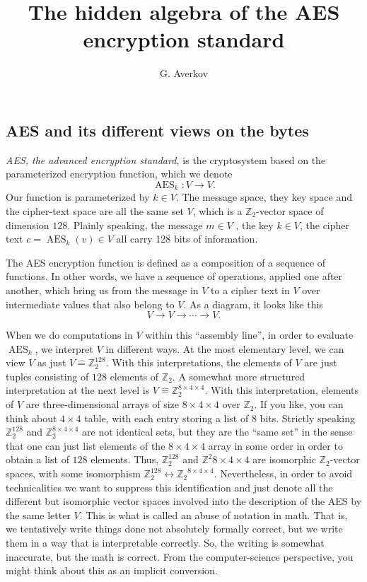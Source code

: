 \documentclass[11pt,a4paper]{amsart}
\title{The hidden algebra of the AES encryption standard}
\author{G. Averkov}
\newcommand{\AES}{\operatorname{AES}}
\newcommand{\Z}{\mathbb{Z}}
\begin{document}
\maketitle

\subsection*{AES and its different views on the bytes}

\emph{AES, the advanced encryption standard,} is  the cryptosystem based on the parameterized encryption function, which we denote
\[
	\AES_k : V \to V.
\] Our function is parameterized by $k \in V$. The message space, they key space and the cipher-text space are all the same set $V$, which  is a $\Z_2$-vector space of dimension $128$. Plainly speaking, the message $m \in V$ , the key $k \in V$, the cipher text $c = \AES_k(v) \in V$ all carry 128 bits of information. 

The AES encryption function is defined as a composition of a sequence of functions. In other words, we have a sequence of operations, applied one after another, which bring us from the message in $V$ to a cipher text in $V$ over intermediate values that also belong to $V$. As a diagram, it looks like this 
\[
	V \to V \to \cdots \to V.
\] 

When we do computations in $V$ within this ``assembly line'', in order to evaluate $\AES_k$, we interpret $V$ in different ways. At the most elementary level, we can view $V$ as just $V \hat{=} \Z_2^{128}$. With this interpretations, the  elements of $V$ are just tuples consisting of $128$ elements of $\Z_2$. A somewhat more structured interpretation at the next level is $V \hat{=} \Z_2^{8 \times 4 \times 4}$. With this interpretation, elements of $V$ are three-dimensional arrays of size $8 \times 4 \times 4$ over $\Z_2$. If you like, you can think about $4 \times 4$ table, with each entry storing a list of $8$ bits. 
Strictly speaking $\Z_2^{128}$ and $\Z_2^{8 \times 4 \times 4}$ are not identical sets, but they are the ``same set'' in the sense that one can just list elements of the $8 \times 4 \times 4$ array in some order in order to obtain a list of $128$ elements. Thus, $\Z_2^{128}$ and $\Z^2{8 \times 4 \times 4}$ are isomorphic $\Z_2$-vector spaces, with some isomorphism $\Z_2^{128} \leftrightarrow {\Z_2}^{8 \times 4 \times 4}$. Nevertheless, in order to avoid technicalities we want to suppress this identification and just denote all the different but isomorphic vector spaces involved into the description of the AES by the same letter $V$. This is what is called an abuse of notation in math. That is, we tentatively write things done not absolutely formally correct, but we write them in a way that is interpretable correctly. So, the writing is somewhat inaccurate, but the math is correct. From the computer-science perspective, you might think about this as an implicit conversion. 
\end{document}
